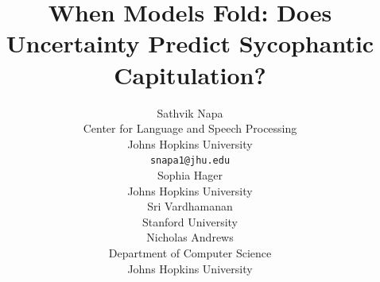 \documentclass[11pt]{article}
\title{When Models Fold: Does Uncertainty Predict Sycophantic Capitulation?}
\author{
  Sathvik Napa \\
  Center for Language and Speech Processing \\
  Johns Hopkins University \\
  \texttt{snapa1@jhu.edu} \\\And
  Sophia Hager \\
  Johns Hopkins University \\\And
  Sri Vardhamanan \\
  Stanford University \\\And
  Nicholas Andrews \\
  Department of Computer Science \\
  Johns Hopkins University \\
}
\newif\ifshowreview
\begin{document}
\maketitle






% 
% 







\ifshowreview
% 
\fi

% 



\appendix

\end{document}
